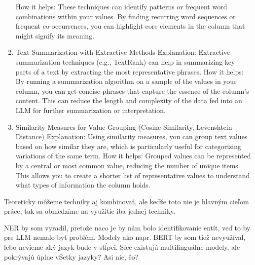 \begin{enumerate}
How it helps: These techniques can identify patterns or frequent word combinations within your values. By finding recurring word sequences or frequent co-occurrences, you can highlight core elements in the column that might signify its meaning.
\item Text Summarization with Extractive Methods
Explanation: Extractive summarization techniques (e.g., TextRank) can help in summarizing key parts of a text by extracting the most representative phrases.
How it helps: By running a summarization algorithm on a sample of the values in your column, you can get concise phrases that capture the essence of the column’s content. This can reduce the length and complexity of the data fed into an LLM for further summarization or interpretation.
\item Similarity Measures for Value Grouping (Cosine Similarity, Levenshtein Distance)
Explanation: Using similarity measures, you can group text values based on how similar they are, which is particularly useful for categorizing variations of the same term.
How it helps: Grouped values can be represented by a central or most common value, reducing the number of unique items. This allows you to create a shorter list of representative values to understand what types of information the column holds.
\end{enumerate}

Teoreticky môžeme techniky aj kombinovať, ale keďže toto nie je hlavným cieľom práce, tak sa obmedzíme na využitie iba jednej techniky.

NER by som vyradil, pretože naco je by nám bolo identifikovanie entít, veď to by pre LLM nemalo byť problém. Modely ako napr. BERT by som tiež nevyužíval, lebo nevieme aký jazyk bude v stĺpci. Síce existujú multilinguálne modely, ale pokrývajú úplne vŠetky jazyky? Asi nie, čo?
